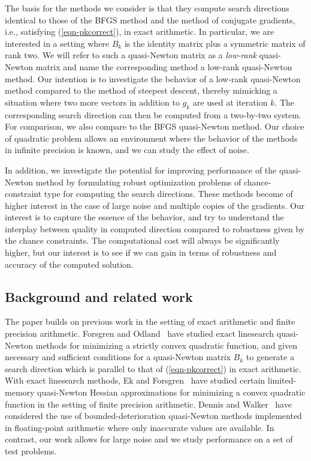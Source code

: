 \documentclass[11pt,twoside]{article}
\begin{document}
The basis for the methods we consider is that they compute search
directions identical to those of the BFGS method and the method of
conjugate gradients, i.e., satisfying (\ref{eqn-pkcorrect}), in exact
arithmetic. In particular, we are interested in a setting where $B_k$
is the identity matrix plus a symmetric matrix of rank two. We will
refer to such a quasi-Newton matrix as a \emph{low-rank} quasi-Newton
matrix and name the corresponding method a low-rank quasi-Newton
method. Our intention is to investigate the behavior of a low-rank
quasi-Newton method compared to the method of steepest descent,
thereby mimicking a situation where two more vectors in addition to
$g_k$ are used at iteration $k$. The corresponding search direction
can then be computed from a two-by-two system. For comparison, we also
compare to the BFGS quasi-Newton method. Our choice of quadratic
problem allows an environment where the behavior of the methods in
infinite precision is known, and we can study the effect of noise.

In addition, we investigate the potential for improving performance of
the quasi-Newton method by formulating robust optimization problems of
chance-constraint type for computing the search directions. These
methods become of higher interest in the case of large noise and
multiple copies of the gradients. Our interest is to capture the
essence of the behavior, and try to understand the interplay between
quality in computed direction compared to robustness given by the
chance constraints. The computational cost will always be
significantly higher, but our interest is to see if we can gain in
terms of robustness and accuracy of the computed solution.

\subsection{Background and related work}

The paper builds on previous work in the setting of exact arithmetic
and finite precision arithmetic. Forsgren and Odland~\cite{FO18} have
studied exact linesearch quasi-Newton methods for minimizing a
strictly convex quadratic function, and given necessary and sufficient
conditions for a quasi-Newton matrix $B_k$ to generate a search
direction which is parallel to that of (\ref{eqn-pkcorrect}) in exact
arithmetic.
With exact linesearch methods, Ek and Forsgren~\cite{EF21} have
studied certain limited-memory quasi-Newton Hessian approximations for
minimizing a convex quadratic function in the setting of finite
precision arithmetic. Dennis and Walker~\cite{DW84} have considered
the use of bounded-deterioration quasi-Newton methods implemented in
floating-point arithmetic where only inaccurate values are
available. In contrast, our work allows for large noise and we study
performance on a set of test problems.
\end{document}
